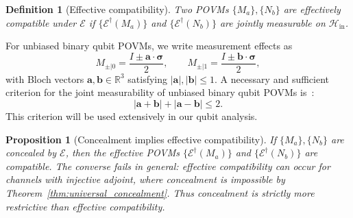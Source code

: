 \documentclass[
aps,pra,twocolumn,10pt,
superscriptaddress,longbibliography,floatfix
]{revtex4-2}
\newtheorem{proposition}[theorem]{Proposition}
\newtheorem{definition}[theorem]{Definition}
\begin{document}
\begin{definition}[Effective compatibility]
Two POVMs $\{M_a\},\{N_b\}$ are \emph{effectively compatible} under $\mathcal E$ if $\{\mathcal E^\dagger(M_a)\}$ and $\{\mathcal E^\dagger(N_b)\}$ are jointly measurable on $\mathcal H_{\mathrm{in}}$.
\end{definition}

For unbiased binary qubit POVMs, we write measurement effects as
\begin{equation}
M_{\pm|0} = \frac{I \pm \mathbf{a}\cdot\boldsymbol{\sigma}}{2}, \qquad
M_{\pm|1} = \frac{I \pm \mathbf{b}\cdot\boldsymbol{\sigma}}{2},
\label{eq:binary_qubit_povm}
\end{equation}
with Bloch vectors $\mathbf{a},\mathbf{b} \in \mathbb{R}^3$ satisfying $|\mathbf{a}|,|\mathbf{b}| \leq 1$.
A necessary and sufficient criterion for the joint measurability of unbiased binary qubit POVMs is~\cite{Busch1986,Yu2010}:
\begin{equation}
|\mathbf{a}+\mathbf{b}| + |\mathbf{a}-\mathbf{b}| \leq 2.
\label{eq:jm_condition}
\end{equation}
This criterion will be used extensively in our qubit analysis.

\begin{proposition}[Concealment implies effective compatibility]
\label{prop:distinction}
If $\{M_a\},\{N_b\}$ are concealed by $\mathcal{E}$, then the effective POVMs $\{\mathcal{E}^\dagger(M_a)\}$ and $\{\mathcal{E}^\dagger(N_b)\}$ are compatible.
The converse fails in general: effective compatibility can occur for channels with injective adjoint, where concealment is impossible by Theorem~\ref{thm:universal_concealment}.
Thus concealment is strictly more restrictive than effective compatibility.
\end{proposition}
\end{document}
